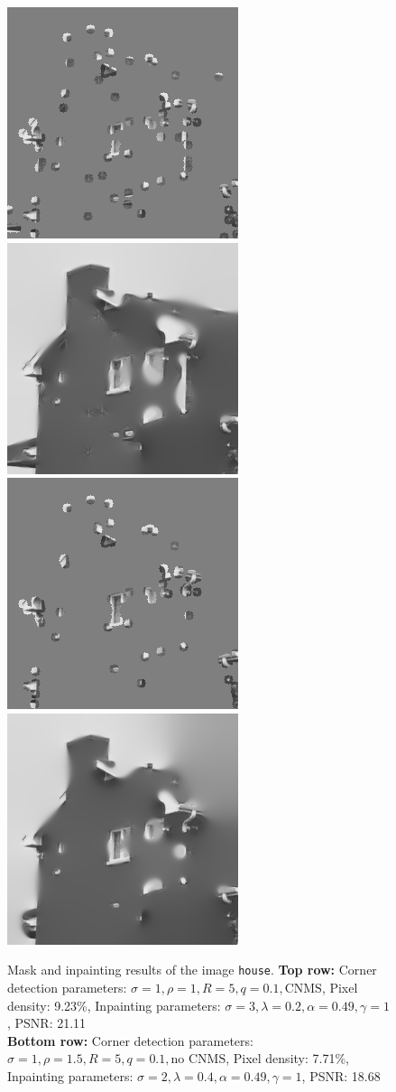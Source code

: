 \begin{figure}[ht]
    \centering
    \includegraphics[width=0.4\linewidth]{../Images/house/house-mask.png}
    \includegraphics[width=0.4\linewidth]{../Images/house/house-inpaint.png}\\\vspace*{0.2cm}
    \includegraphics[width=0.4\linewidth]{../Images/house/house-mask3.png}
    \includegraphics[width=0.4\linewidth]{../Images/house/house-inpaint3.png}
    \caption{Mask and inpainting results of the image \texttt{house}. 
        \textbf{Top row: }Corner detection parameters: $\sigma=1,\rho=1,R=5,q=0.1, \text{CNMS}$, Pixel density: 9.23\%, Inpainting parameters:
    $\sigma=3,\lambda=0.2,\alpha=0.49,\gamma=1$, PSNR: 21.11\\
    \textbf{Bottom row: }Corner detection parameters: $\sigma=1,\rho=1.5,R=5,q=0.1, \text{no
    CNMS}$, Pixel density: 7.71\%, Inpainting parameters:
    $\sigma=2,\lambda=0.4,\alpha=0.49,\gamma=1$, PSNR: 18.68}\label{fig:HouseEx}
\end{figure}
